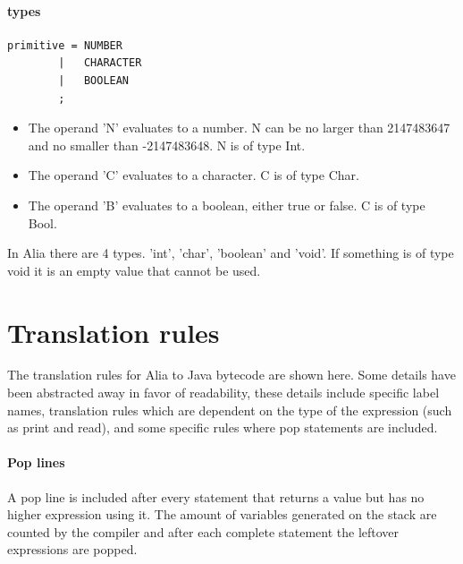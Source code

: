 \documentclass[paper=a4, fontsize=11pt]{article}
\numberwithin{equation}{section}		%
\numberwithin{figure}{section}			%
\numberwithin{table}{section}				%
\begin{document}
\paragraph{types}
\begin{verbatim}
primitive =	NUMBER
		|	CHARACTER
		|	BOOLEAN
		;
\end{verbatim}
\begin{itemize}
\item The operand 'N' evaluates to a number. N can be no larger than 2147483647 and no smaller than -2147483648. N is of type Int.
\item The operand 'C' evaluates to a character. C is of type Char.
\item The operand 'B' evaluates to a boolean, either true or false. C is of type Bool.
\end{itemize}
In Alia there are 4 types. 'int', 'char', 'boolean' and 'void'. If something is of type void it is an empty value that cannot be used.

\section{Translation rules} %
The translation rules for Alia to Java bytecode are shown here. Some details have been abstracted away in favor of readability, these details include specific label names, translation rules which are dependent on the type of the expression (such as print and read), and some specific rules where pop statements are included.

\paragraph{Pop lines}
A pop line is included after every statement that returns a value but has no higher expression using it. The amount of variables generated on the stack are counted by the compiler and after each complete statement the leftover expressions are popped.
\end{document}
